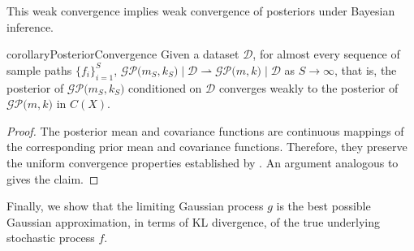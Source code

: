\documentclass{article}
\newcommand{\K}{S}
\newcommand{\stochprocess}{f}
\begin{document}
This weak convergence implies weak convergence of posteriors under Bayesian inference.
\begin{restatable}{corollary}{PosteriorConvergence}
\label{thm:posterior_convergence}
Given a dataset $\mathcal{D}$, for almost every sequence of sample paths $\{ \stochprocess_i \}_{i=1}^\K$, $\mathcal{GP}\bigl(m_\K, k_\K\bigr) \!\mid\! \mathcal{D} \rightharpoonup \mathcal{GP}\bigl(m, k\bigr) \!\mid\! \mathcal{D}$ as $\K \to \infty$,
that is, the posterior of $\mathcal{GP}\bigl(m_\K, k_\K\bigr)$ conditioned on $\mathcal{D}$ converges weakly to the posterior of $\mathcal{GP}\bigl(m, k\bigr)$ in $C(X)$.
\end{restatable}
\begin{proof}
The posterior mean and covariance functions are continuous mappings of the corresponding prior mean and covariance functions.
Therefore, they preserve the uniform convergence properties established by .
An argument analogous to  gives the claim.
\end{proof}
Finally, we show that the limiting Gaussian process $g$ is the best possible Gaussian approximation, in terms of KL divergence, of the true underlying stochastic process $f$.
\end{document}

